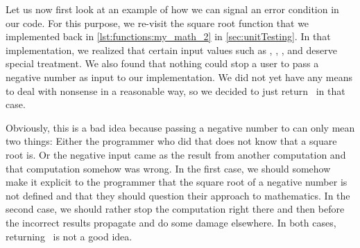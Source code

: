 %
%
%
\endhsection%
%
%
%
%
%
%
%
Let us now first look at an example of how we can signal an error condition in our code.
For this purpose, we re-visit the square root function that  we implemented back in \cref{lst:functions:my_math_2} in \cref{sec:unitTesting}.
In that implementation, we realized that certain input values such as , , , and  deserve special treatment.
We also found that nothing could stop a user to pass a negative number as input to our  implementation.
We did not yet have any means to deal with nonsense in a reasonable way, so we decided to just return~ in that case.

Obviously, this is a bad idea because passing a negative number to  can only mean two things:
Either the programmer who did that does not know that a square root is.
Or the negative input came as the result from another computation and that computation somehow was wrong.
In the first case, we should somehow make it explicit to the programmer that the square root of a negative number is not defined and that they should question their approach to mathematics.
In the second case, we should rather stop the computation right there and then before the incorrect results propagate and do some damage elsewhere.
In both cases, returning~ is not a good idea.


